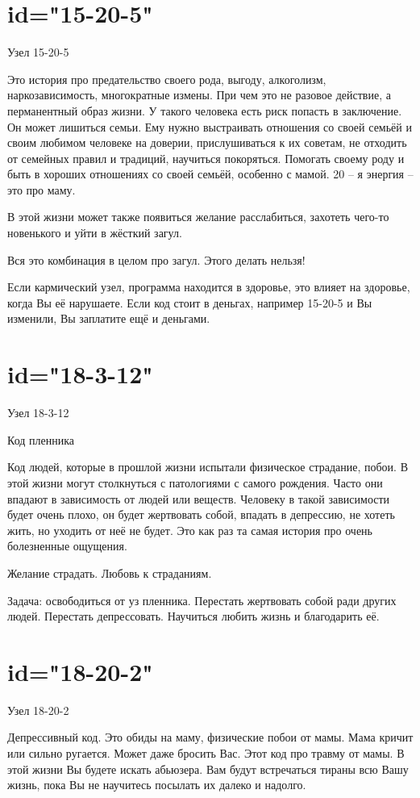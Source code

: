 \section{id="15-20-5"}{Узел 15-20-5}
\item Это история про предательство своего рода, выгоду, 
алкоголизм, наркозависимость, многократные измены. При чем 
это не разовое действие, а перманентный образ жизни. У такого 
человека есть риск попасть в заключение. Он может лишиться 
семьи. Ему нужно выстраивать отношения со своей семьёй и 
своим любимом человеке на доверии, прислушиваться к их советам, 
не отходить от семейных правил и традиций, научиться покоряться. 
Помогать своему роду и быть в хороших отношениях со своей 
семьёй, особенно с мамой. 20 – я энергия – это про маму.
\item В этой жизни может также появиться желание расслабиться, 
захотеть чего-то новенького и уйти в жёсткий загул.
\item Вся это комбинация в целом про загул. Этого делать нельзя!
\item Если кармический узел, программа находится в здоровье, 
это влияет на здоровье, когда Вы её нарушаете. Если код стоит 
в деньгах, например 15-20-5 и Вы изменили, Вы заплатите ещё 
и деньгами.
\endsection

\section{id="18-3-12"}{Узел 18-3-12}
\item Код пленника
\item Код людей, которые в прошлой жизни испытали физическое 
страдание, побои. В этой жизни могут столкнуться с патологиями 
с самого рождения. Часто они впадают в зависимость от людей 
или веществ. Человеку в такой зависимости будет очень плохо, 
он будет жертвовать собой, впадать в депрессию, не хотеть жить, 
но уходить от неё не будет. Это как раз та самая история про 
очень болезненные ощущения.
\item Желание страдать. Любовь к страданиям.
\item Задача: освободиться от уз пленника. Перестать жертвовать 
собой ради других людей. Перестать депрессовать. Научиться 
любить жизнь и благодарить её.
\endsection

\section{id="18-20-2"}{Узел 18-20-2}
\item Депрессивный код. Это обиды на маму, физические побои 
от мамы. Мама кричит или сильно ругается. Может даже бросить 
Вас. Этот код про травму от мамы. В этой жизни Вы будете 
искать абьюзера. Вам будут встречаться тираны всю Вашу жизнь, 
пока Вы не научитесь посылать их далеко и надолго.
\endsection

